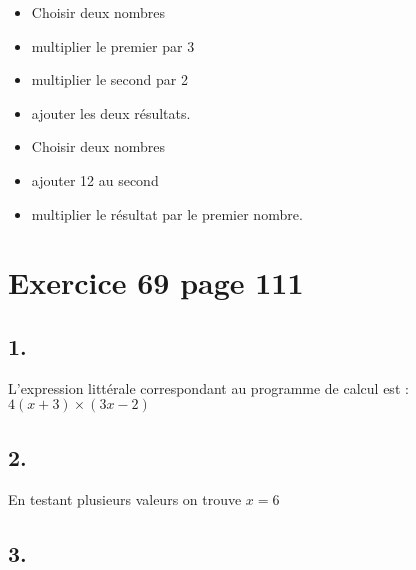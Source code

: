 \documentclass[12pt,a4paper]{article}
\begin{document}
\begin{multicols}{2}
	\begin{itemize}
		\item Choisir deux nombres
		\item multiplier le premier par 3
		\item multiplier le second par 2
		\item ajouter les deux résultats.
	\end{itemize}


	\begin{itemize}
		\item Choisir deux nombres
		\item ajouter 12 au second 
		\item multiplier le résultat par le premier nombre.
	\end{itemize}
\end{multicols}


\section*{Exercice 69 page 111}

\subsection*{1.}

L'expression littérale correspondant au programme de calcul est  : $ 4(x+3) \times (3x -2)$

\subsection*{2.}
En testant plusieurs valeurs on trouve $x=6$

\newpage

\subsection*{3.}
\end{document}
